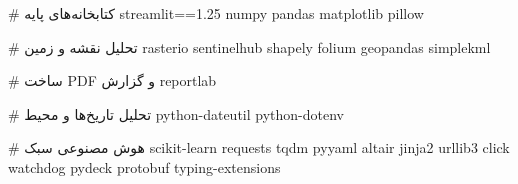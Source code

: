 # کتابخانه‌های پایه
streamlit==1.25
numpy
pandas
matplotlib
pillow

# تحلیل نقشه و زمین
rasterio
sentinelhub
shapely
folium
geopandas
simplekml

# ساخت PDF و گزارش
reportlab

# تحلیل تاریخ‌ها و محیط
python-dateutil
python-dotenv

# هوش مصنوعی سبک
scikit-learn
requests
tqdm
pyyaml
altair
jinja2
urllib3
click
watchdog
pydeck
protobuf
typing-extensions
